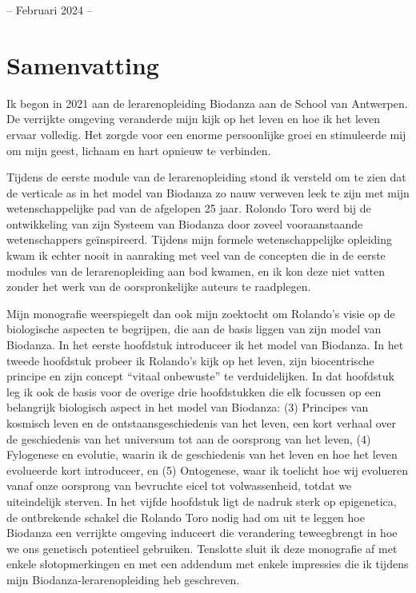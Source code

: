\documentclass[
  11pt,
]{book}
\begin{document}
-- Februari 2024 --

\hypertarget{samenvatting}{%
\chapter*{Samenvatting}\label{samenvatting}}

Ik begon in 2021 aan de lerarenopleiding Biodanza aan de School van Antwerpen. De verrijkte omgeving veranderde mijn kijk op het leven en hoe ik het leven ervaar volledig. Het zorgde voor een enorme persoonlijke groei en stimuleerde mij om mijn geest, lichaam en hart opnieuw te verbinden.

Tijdens de eerste module van de lerarenopleiding stond ik versteld om te zien dat de verticale as in het model van Biodanza zo nauw verweven leek te zijn met mijn wetenschappelijke pad van de afgelopen 25 jaar. Rolondo Toro werd bij de ontwikkeling van zijn Systeem van Biodanza door zoveel vooraanstaande wetenschappers geïnspireerd. Tijdens mijn formele wetenschappelijke opleiding kwam ik echter nooit in aanraking met veel van de concepten die in de eerste modules van de lerarenopleiding aan bod kwamen, en ik kon deze niet vatten zonder het werk van de oorspronkelijke auteurs te raadplegen.

Mijn monografie weerspiegelt dan ook mijn zoektocht om Rolando's visie op de biologische aspecten te begrijpen, die aan de basis liggen van zijn model van Biodanza. In het eerste hoofdstuk introduceer ik het model van Biodanza. In het tweede hoofdstuk probeer ik Rolando's kijk op het leven, zijn biocentrische principe en zijn concept ``vitaal onbewuste'' te verduidelijken. In dat hoofdstuk leg ik ook de basis voor de overige drie hoofdstukken die elk focussen op een belangrijk biologisch aspect in het model van Biodanza: (3) Principes van kosmisch leven en de ontstaansgeschiedenis van het leven, een kort verhaal over de geschiedenis van het universum tot aan de oorsprong van het leven, (4) Fylogenese en evolutie, waarin ik de geschiedenis van het leven en hoe het leven evolueerde kort introduceer, en (5) Ontogenese, waar ik toelicht hoe wij evolueren vanaf onze oorsprong van bevruchte eicel tot volwassenheid, totdat we uiteindelijk sterven. In het vijfde hoofdstuk ligt de nadruk sterk op epigenetica, de ontbrekende schakel die Rolando Toro nodig had om uit te leggen hoe Biodanza een verrijkte omgeving induceert die verandering teweegbrengt in hoe we ons genetisch potentieel gebruiken. Tenslotte sluit ik deze monografie af met enkele slotopmerkingen en met een addendum met enkele impressies die ik tijdens mijn Biodanza-lerarenopleiding heb geschreven.
\end{document}
